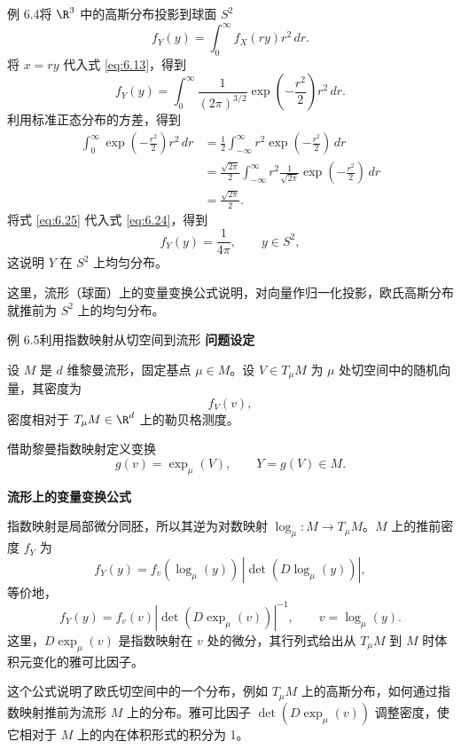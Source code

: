\begin{statement}{例 6.4}{将 $\R^3$ 中的高斯分布投影到球面 $S^2$}
\begin{equation*}
  f_Y(y)=\int_0^\infty f_X(ry)r^2\,dr.
  \tag{6.23}\label{eq:6.23}
\end{equation*}
将 $x=ry$ 代入式 \eqref{eq:6.13}，得到
\begin{equation*}
  f_Y(y)=\int_0^\infty \frac{1}{(2\pi)^{3/2}}\exp\left(-\frac{r^2}{2}\right)r^2\,dr.
  \tag{6.24}\label{eq:6.24}
\end{equation*}
利用标准正态分布的方差，得到
\begin{equation*}
  \begin{aligned}
   \int_0^\infty \exp\left(-\frac{r^2}{2}\right)r^2\,dr
     &=\frac12\int_{-\infty}^{\infty}r^2\exp\left(-\frac{r^2}{2}\right)\,dr\\
     &=\frac{\sqrt{2\pi}}{2}\int_{-\infty}^{\infty}
         r^2\frac{1}{\sqrt{2\pi}}\exp\left(-\frac{r^2}{2}\right)\,dr\\
     &=\frac{\sqrt{2\pi}}{2}.
  \end{aligned}
  \tag{6.25}\label{eq:6.25}
\end{equation*}
将式 \eqref{eq:6.25} 代入式 \eqref{eq:6.24}，得到
\begin{equation*}
  f_Y(y)=\frac{1}{4\pi},\qquad y\in S^2,
  \tag{6.26}\label{eq:6.26}
\end{equation*}
这说明 $Y$ 在 $S^2$ 上均匀分布。

这里，流形（球面）上的变量变换公式说明，对向量作归一化投影，欧氏高斯分布就推前为 $S^2$ 上的均匀分布。
\end{statement}

\begin{statement}{例 6.5}{利用指数映射从切空间到流形}
\textbf{问题设定}\par
设 $M$ 是 $d$ 维黎曼流形，固定基点 $\mu\in M$。设 $V\in T_\mu M$ 为 $\mu$ 处切空间中的随机向量，其密度为
\[
  f_V(v),
\]
密度相对于 $T_\mu M\in\R^d$ 上的勒贝格测度。

借助黎曼指数映射定义变换
\[
  g(v)=\exp_\mu(V),\qquad Y=g(V)\in M.
\]

\medskip
\textbf{流形上的变量变换公式}\par
指数映射是局部微分同胚，所以其逆为对数映射 $\log_\mu\colon M\to T_\mu M$。$M$ 上的推前密度 $f_Y$ 为
\begin{equation*}
  f_Y(y)=f_v(\log_\mu(y))\,\left|\det(D\log_\mu(y))\right|,
  \tag{6.27}\label{eq:6.27}
\end{equation*}
等价地，
\[
  f_Y(y)=f_v(v)\left|\det(D\exp_\mu(v))\right|^{-1},\qquad v=\log_\mu(y).
\]
这里，$D\exp_\mu(v)$ 是指数映射在 $v$ 处的微分，其行列式给出从 $T_\mu M$ 到 $M$ 时体积元变化的雅可比因子。

这个公式说明了欧氏切空间中的一个分布，例如 $T_\mu M$ 上的高斯分布，如何通过指数映射推前为流形 $M$ 上的分布。雅可比因子 $\det(D\exp_\mu(v))$ 调整密度，使它相对于 $M$ 上的内在体积形式的积分为 1。
\end{statement}

